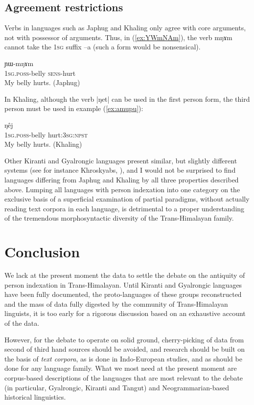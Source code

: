\documentclass[oldfontcommands,oneside,a4paper,11pt]{article}
\newcommand{\ipa}[1]{{\phon \mbox{#1}}} %
\begin{document}
\subsection{Agreement restrictions}
Verbs in languages such as Japhug and Khaling only agree with core arguments, not with possessor of arguments. Thus, in (\ref{ex:YWmNAm}), the verb \ipa{mŋɤm} cannot take the \textsc{1sg} suffix \ipa{--a} (such a form would be nonsensical).

\begin{exe}
\ex \label{ex:YWmNAm}
\gll \ipa{a-xtu} 	\ipa{ɲɯ-mŋɤm} \\
\textsc{1sg.poss}-belly \textsc{sens}-hurt \\
\glt My belly hurts. (Japhug)
\end{exe}

In Khaling, although the verb \ipa{|ŋet|} can be used in the first person form, the third person must be used in example (\ref{ex:amupu}):

\begin{exe}
\ex \label{ex:amupu}
\gll \ipa{ʔʌ-mupu} 	\ipa{ŋêj} \\
\textsc{1sg.poss}-belly hurt:\textsc{3sg:npst} \\
\glt My belly hurts. (Khaling)
\end{exe}

Other Kiranti and Gyalrongic languages present similar, but slightly different systems (see for instance Khroskyabs, \citealt{lai15person}), and I would not be surprised to find languages differing from Japhug and Khaling by all three properties described above. Lumping all languages with person indexation into one category on the exclusive basis of a superficial examination of partial paradigms, without actually reading text corpora in each  language, is detrimental to a proper understanding of the tremendous morphosyntactic diversity of the Trans-Himalayan family.

\section{Conclusion}

We lack at the present moment the data to settle the debate on the antiquity of person indexation in Trans-Himalayan. Until Kiranti and Gyalrongic languages have been fully documented, the proto-languages of these groups reconstructed and the mass of data fully digested by the community of Trans-Himalayan linguists, it is too early for a rigorous discussion based on an exhaustive account of the data. 


However,  for the debate to operate on solid ground, cherry-picking of data from second of third hand sources should be avoided, and research should be built on the basis of \textit{text corpora}, as is done in Indo-European studies, and as should be done for any language family. What we most need at the present moment are corpus-based descriptions of the languages that are most relevant to the debate (in particular, Gyalrongic, Kiranti and Tangut) and Neogrammarian-based historical linguistics.

\charis


\end{document}

